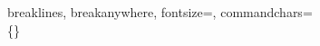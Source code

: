 
\usepackage{fancyvrb}
\usepackage{fvextra}
\usepackage{geometry}
\usepackage{titlesec}
\usepackage{longtable}
\usepackage{caption}
\usepackage{fontspec}
\setmainfont{Times New Roman}

{breaklines, breakanywhere, fontsize=\small, commandchars=\\\{\}}


\captionsetup[table]{skip=10pt}

